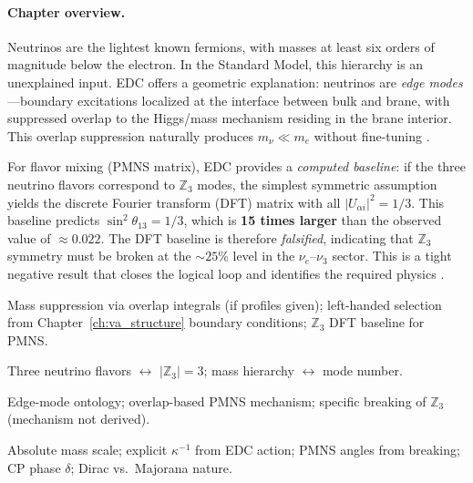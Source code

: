 
\paragraph{Chapter overview.}
Neutrinos are the lightest known fermions, with masses at least six orders of
magnitude below the electron. In the Standard Model, this hierarchy is an
unexplained input. EDC offers a geometric explanation: neutrinos are
\emph{edge modes}---boundary excitations localized at the interface between
bulk and brane, with suppressed overlap to the Higgs/mass mechanism residing
in the brane interior. This overlap suppression naturally produces $m_\nu \ll m_e$
without fine-tuning \tagDc{}.

For flavor mixing (PMNS matrix), EDC provides a \emph{computed baseline}: if the
three neutrino flavors correspond to $\mathbb{Z}_3$ modes, the simplest symmetric
assumption yields the discrete Fourier transform (DFT) matrix with all
$|U_{\alpha i}|^2 = 1/3$. This baseline predicts $\sin^2\theta_{13} = 1/3$,
which is \textbf{15 times larger} than the observed value of $\approx 0.022$.
The DFT baseline is therefore \emph{falsified}, indicating that $\mathbb{Z}_3$
symmetry must be broken at the $\sim 25\%$ level in the $\nu_e$--$\nu_3$ sector.
This is a tight negative result that closes the logical loop and identifies the
required physics \tagDc{}.


\begin{tcolorbox}[colback=blue!5, colframe=blue!50!black,
    title=\textbf{Reader Map: What This Chapter Establishes}]
\begin{description}[style=nextline, leftmargin=1em, font=\normalfont\bfseries]
    \item[Derived \tagDc{}:]
        Mass suppression via overlap integrals (if profiles given);
        left-handed selection from Chapter~\ref{ch:va_structure} boundary conditions;
        $\mathbb{Z}_3$ DFT baseline for PMNS.

    \item[Identified \tagI{}:]
        Three neutrino flavors $\leftrightarrow$ $|\mathbb{Z}_3| = 3$;
        mass hierarchy $\leftrightarrow$ mode number.

    \item[Postulated \tagP{}:]
        Edge-mode ontology;
        overlap-based PMNS mechanism;
        specific breaking of $\mathbb{Z}_3$ (mechanism not derived).

    \item[Open (not addressed):]
        Absolute mass scale;
        explicit $\kappa^{-1}$ from EDC action;
        PMNS angles from breaking;
        CP phase $\delta$;
        Dirac vs.\ Majorana nature.
\end{description}
\end{tcolorbox}

